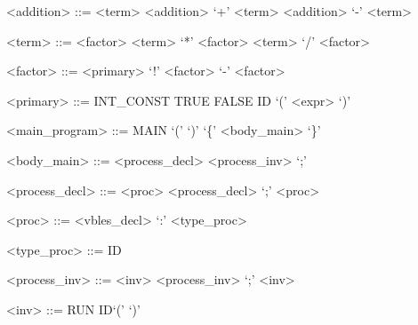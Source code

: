 \begin{grammar}
<addition> ::= <term>
\alt <addition>  `+' <term>
\alt <addition>  `-' <term>

<term> ::= <factor>
\alt <term>  `*' <factor>
\alt <term>  `/' <factor>

<factor> ::= <primary>
\alt `!' <factor>
\alt `-' <factor>

<primary> ::= INT_CONST
\alt TRUE
\alt FALSE
\alt ID
\alt `(' <expr> `)'


<main_program> ::= MAIN `('  `)'  `\{'  <body_main> `\}' 

<body_main> ::= <process_decl> <process_inv> `;'


<process_decl> ::= <proc> 
\alt <process_decl>  `;' <proc>

<proc> ::=  <vbles_decl> `:' <type_proc> 
              
<type_proc> ::= ID

<process_inv> ::= <inv> 
\alt <process_inv>  `;' <inv>


<inv> ::= RUN ID`(' `)'

\end{grammar}